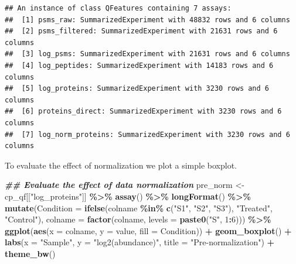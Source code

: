 \documentclass[9pt,a4paper,]{extarticle}
\newenvironment{Shaded}{\begin{snugshade}}{\end{snugshade}}
\newcommand{\AttributeTok}[1]{\textcolor[rgb]{0.13,0.29,0.53}{#1}}
\newcommand{\DecValTok}[1]{\textcolor[rgb]{0.00,0.00,0.81}{#1}}
\newcommand{\DocumentationTok}[1]{\textcolor[rgb]{0.56,0.35,0.01}{\textbf{\textit{#1}}}}
\newcommand{\FunctionTok}[1]{\textcolor[rgb]{0.13,0.29,0.53}{\textbf{#1}}}
\newcommand{\NormalTok}[1]{#1}
\newcommand{\OtherTok}[1]{\textcolor[rgb]{0.56,0.35,0.01}{#1}}
\newcommand{\SpecialCharTok}[1]{\textcolor[rgb]{0.81,0.36,0.00}{\textbf{#1}}}
\newcommand{\StringTok}[1]{\textcolor[rgb]{0.31,0.60,0.02}{#1}}
\begin{document}
\begin{verbatim}
## An instance of class QFeatures containing 7 assays:
##  [1] psms_raw: SummarizedExperiment with 48832 rows and 6 columns 
##  [2] psms_filtered: SummarizedExperiment with 21631 rows and 6 columns 
##  [3] log_psms: SummarizedExperiment with 21631 rows and 6 columns 
##  [4] log_peptides: SummarizedExperiment with 14183 rows and 6 columns 
##  [5] log_proteins: SummarizedExperiment with 3230 rows and 6 columns 
##  [6] proteins_direct: SummarizedExperiment with 3230 rows and 6 columns 
##  [7] log_norm_proteins: SummarizedExperiment with 3230 rows and 6 columns
\end{verbatim}

To evaluate the effect of normalization we plot a simple boxplot.

\begin{Shaded}
\begin{Highlighting}[]
\DocumentationTok{\#\# Evaluate the effect of data normalization}
\NormalTok{pre\_norm }\OtherTok{\textless{}{-}}\NormalTok{ cp\_qf[[}\StringTok{"log\_proteins"}\NormalTok{]] }\SpecialCharTok{\%\textgreater{}\%}
  \FunctionTok{assay}\NormalTok{() }\SpecialCharTok{\%\textgreater{}\%}
  \FunctionTok{longFormat}\NormalTok{() }\SpecialCharTok{\%\textgreater{}\%}
  \FunctionTok{mutate}\NormalTok{(}\AttributeTok{Condition =} \FunctionTok{ifelse}\NormalTok{(colname }\SpecialCharTok{\%in\%} \FunctionTok{c}\NormalTok{(}\StringTok{"S1"}\NormalTok{, }\StringTok{"S2"}\NormalTok{, }\StringTok{"S3"}\NormalTok{),}
                            \StringTok{"Treated"}\NormalTok{, }\StringTok{"Control"}\NormalTok{),}
         \AttributeTok{colname =} \FunctionTok{factor}\NormalTok{(colname, }\AttributeTok{levels =} \FunctionTok{paste0}\NormalTok{(}\StringTok{"S"}\NormalTok{, }\DecValTok{1}\SpecialCharTok{:}\DecValTok{6}\NormalTok{))) }\SpecialCharTok{\%\textgreater{}\%}
  \FunctionTok{ggplot}\NormalTok{(}\FunctionTok{aes}\NormalTok{(}\AttributeTok{x =}\NormalTok{ colname, }\AttributeTok{y =}\NormalTok{ value, }\AttributeTok{fill =}\NormalTok{ Condition)) }\SpecialCharTok{+}
  \FunctionTok{geom\_boxplot}\NormalTok{() }\SpecialCharTok{+}
  \FunctionTok{labs}\NormalTok{(}\AttributeTok{x =} \StringTok{"Sample"}\NormalTok{, }\AttributeTok{y =} \StringTok{"log2(abundance)"}\NormalTok{, }\AttributeTok{title =} \StringTok{"Pre{-}normalization"}\NormalTok{) }\SpecialCharTok{+}
  \FunctionTok{theme\_bw}\NormalTok{()}


\end{Highlighting}
\end{Shaded}
\end{document}
